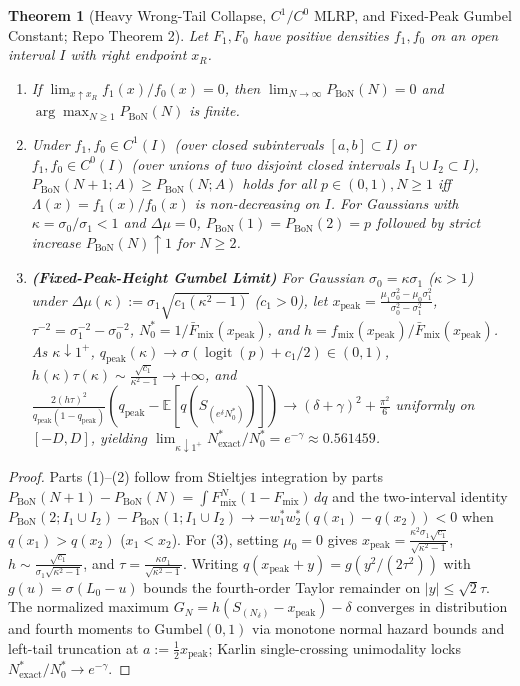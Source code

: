 \documentclass{article}
\theoremstyle{plain}
\newtheorem{theorem}{Theorem}
\theoremstyle{definition}
\theoremstyle{remark}
\newcommand{\E}{\mathbb{E}}
\newcommand{\logit}{\operatorname{logit}}
\newcommand{\Fmix}{F_{\mathrm{mix}}}
\newcommand{\barFmix}{\bar{F}_{\mathrm{mix}}}
\newcommand{\fmix}{f_{\mathrm{mix}}}
\begin{document}
\begin{theorem}[Heavy Wrong-Tail Collapse, $C^1/C^0$ MLRP, and Fixed-Peak Gumbel Constant; Repo Theorem 2]
\label{thm:app-collapse}
Let $F_1, F_0$ have positive densities $f_1, f_0$ on an open interval $I$ with right endpoint $x_R$.
\begin{enumerate}[leftmargin=1.8em,itemsep=2pt]
    \item If $\lim_{x\uparrow x_R} f_1(x)/f_0(x) = 0$, then $\lim_{N\to\infty} P_{\mathrm{BoN}}(N) = 0$ and $\arg\max_{N\ge 1} P_{\mathrm{BoN}}(N)$ is finite.
    \item Under $f_1, f_0 \in C^1(I)$ (over closed subintervals $[a,b] \subset I$) or $f_1, f_0 \in C^0(I)$ (over unions of two disjoint closed intervals $I_1 \cup I_2 \subset I$), $P_{\mathrm{BoN}}(N+1; A) \ge P_{\mathrm{BoN}}(N; A)$ holds for all $p \in (0, 1), N \ge 1$ iff $\Lambda(x) = f_1(x)/f_0(x)$ is non-decreasing on $I$. For Gaussians with $\kappa = \sigma_0/\sigma_1 < 1$ and $\Delta\mu = 0$, $P_{\mathrm{BoN}}(1) = P_{\mathrm{BoN}}(2) = p$ followed by strict increase $P_{\mathrm{BoN}}(N) \uparrow 1$ for $N \ge 2$.
    \item \textbf{(Fixed-Peak-Height Gumbel Limit)} For Gaussian $\sigma_0 = \kappa\sigma_1$ ($\kappa > 1$) under $\Delta\mu(\kappa) := \sigma_1\sqrt{c_1(\kappa^2-1)}$ ($c_1 > 0$), let $x_{\mathrm{peak}} = \frac{\mu_1\sigma_0^2 - \mu_0\sigma_1^2}{\sigma_0^2 - \sigma_1^2}$, $\tau^{-2} = \sigma_1^{-2} - \sigma_0^{-2}$, $N_0^* = 1/\barFmix(x_{\mathrm{peak}})$, and $h = \fmix(x_{\mathrm{peak}})/\barFmix(x_{\mathrm{peak}})$. As $\kappa \downarrow 1^+$, $q_{\mathrm{peak}}(\kappa) \to \sigma(\logit(p) + c_1/2) \in (0, 1)$, $h(\kappa)\tau(\kappa) \sim \frac{\sqrt{c_1}}{\kappa^2 - 1} \to +\infty$, and $\frac{2(h\tau)^2}{q_{\mathrm{peak}}(1-q_{\mathrm{peak}})}(q_{\mathrm{peak}} - \E[q(S_{(e^\delta N_0^*)})]) \to (\delta + \gamma)^2 + \frac{\pi^2}{6}$ uniformly on $[-D, D]$, yielding $\lim_{\kappa \downarrow 1^+} N^*_{\mathrm{exact}} / N_0^* = e^{-\gamma} \approx 0.561459$.
\end{enumerate}
\end{theorem}
\begin{proof}
Parts (1)--(2) follow from Stieltjes integration by parts $P_{\mathrm{BoN}}(N+1)-P_{\mathrm{BoN}}(N) = \int \Fmix^N(1-\Fmix)\,dq$ and the two-interval identity $P_{\mathrm{BoN}}(2; I_1\cup I_2) - P_{\mathrm{BoN}}(1; I_1\cup I_2) \to -w_1^* w_2^*(q(x_1)-q(x_2)) < 0$ when $q(x_1) > q(x_2)$ ($x_1 < x_2$). For (3), setting $\mu_0 = 0$ gives $x_{\mathrm{peak}} = \frac{\kappa^2\sigma_1\sqrt{c_1}}{\sqrt{\kappa^2-1}}$, $h \sim \frac{\sqrt{c_1}}{\sigma_1\sqrt{\kappa^2-1}}$, and $\tau = \frac{\kappa\sigma_1}{\sqrt{\kappa^2-1}}$. Writing $q(x_{\mathrm{peak}}+y) = g(y^2/(2\tau^2))$ with $g(u) = \sigma(L_0 - u)$ bounds the fourth-order Taylor remainder on $|y| \le \sqrt{2}\tau$. The normalized maximum $G_N = h(S_{(N_\delta)} - x_{\mathrm{peak}}) - \delta$ converges in distribution and fourth moments to $\mathrm{Gumbel}(0,1)$ via monotone normal hazard bounds and left-tail truncation at $a := \frac{1}{2}x_{\mathrm{peak}}$; Karlin single-crossing unimodality locks $N^*_{\mathrm{exact}}/N_0^* \to e^{-\gamma}$.
\end{proof}
\end{document}
